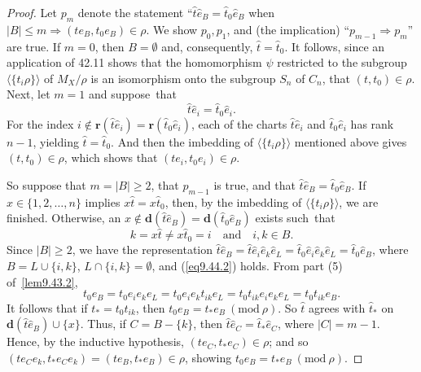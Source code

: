 \documentclass{surv-l}
\numberwithin{equation}{section}
\numberwithin{table}{section}
\numberwithin{figure}{section}
\theoremstyle{plain}
\theoremstyle{definition}
\begin{document}
\begin{proof}Let $p_{m}$ denote the statement
``$\widehat{t}\widehat{e}_{B}=\widehat{t}_{0}\widehat{e}_{B}$ when
$|B|\leq m \Rightarrow (te_{B}, t_{0}e_{B}) \in\rho$. We show
$p_{0}, p_{1}$, and (the implication) ``$p_{m-1}\Rightarrow
p_{m}$'' are true. If $m=0$, then $B=\emptyset$ and,
consequently, $\widehat{t}=\widehat{t}_{0}$. It follows, since an
application of 42.11 shows that the homomorphism $\psi$ restricted
to the subgroup $\langle\{t_{i}\rho\}\rangle$ of $M_{X}/\rho$ is
an isomorphism onto the subgroup $S_{n}$ of $C_{n}$, that $(t,
t_{0})\in\rho$. Next, let $m=1$ and suppose~that
\[
\widehat{t}\widehat{e}_{i}=\widehat{t}_{0}\widehat{e}_{i}.
\]
For the index $i\not\in
\mathbf{r}(\widehat{t}\widehat{e}_{i})=\mathbf{r}(\widehat{t}_{0}\widehat{e}_{i})$,
each of the charts $\widehat{t}\widehat{e}_{i}$ and
$\widehat{t}_{0}\widehat{e}_{i}$ has rank $n -1$, yielding
$\widehat{t}=\widehat{t}_{0}$. And then the imbedding of
$\langle\{t_{i}\rho\}\rangle$ mentioned above gives $(t,
t_{0})\in\rho$, which shows that $(te_{i}, t_{0}e_{i})\in\rho$.

So suppose that $m=|B|\geq 2$, that $p_{m-1}$ is true, and that
$\widehat{t}\widehat{e}_{B}=\widehat{t}_{0}\widehat{e}_{B}$. If
$x\in\{1,2,\ldots, n\}$ implies $x\widehat{t}=x\widehat{t}_{0}$,
then, by the imbedding of $\langle \{t_{i}\rho\}\rangle$, we are
finished. Otherwise, an $x\not\in
\mathbf{d}(\widehat{t}\widehat{e}_{B})=\mathbf{d}(\widehat{t}_{0}\widehat{e}_{B})$
exists such~that
\begin{equation}\label{eq9.44.2}
k=x\widehat{t}\neq x\widehat{t}_{0}=i\quad \mathrm{and}\quad i,k \in B.
\end{equation}
Since $|B|\geq 2$, we have the representation
$\widehat{t}\widehat{e}_{B}=\widehat{t}\widehat{e}_{i}\widehat{e}_{k}\widehat{e}_{L}
=\widehat{t}_{0}\widehat{e}_{i}\widehat{e}_{k}\widehat{e}_{L}=\widehat{t}_{0}\widehat{e}_{B}$,
where $B= L \cup \{i, k\}$, $L\cap\{i, k\}=\emptyset$, and
(\ref{eq9.44.2}) holds. From part (5) of~\ref{lem9.43.2},
\[
t_{0}e_{B}=t_{0}e_{i}e_{k}e_{L}=t_{0}e_{i}e_{k}t_{ik}e_{L}=t_{0}t_{ik}e_{i}e_{k}e_{L}=t_{0}t_{ik}e_{B}.
\]
It follows that if $t_{\ast}=t_{0}t_{ik}$, then
$t_{0}e_{B}=t_{\ast}e_{B}\ (\mathrm{mod}\ \rho)$. So $\widehat{t}$
agrees with $\widehat{t}_{\ast}$ on
$\mathbf{d}(\widehat{t}\widehat{e}_{B})\cup\{x\}$. Thus, if
$C=B-\{k\}$, then
$\widehat{t}\widehat{e}_{C}=\widehat{t}_{\ast}\widehat{e}_{C}$,
where $|C|=m-1$. Hence, by the inductive hypothesis, $(te_{C},
t_{\ast}e_{C})\in\rho$; and so $(te_{C}e_{k}, t_{\ast}e_{C}e_{k})
=(te_{B}, t_{\ast}e_{B})\in\rho$, showing
$t_{0}e_{B}=t_{\ast}e_{B}\ (\mathrm{mod}\ \rho).$
\end{proof}
\end{document}
